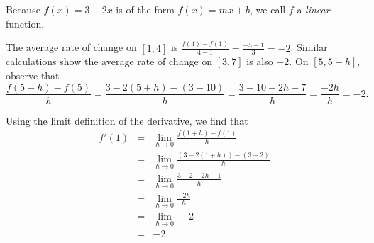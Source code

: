 \begin{activitySolution}
\ba
	\item Because $f(x) = 3 - 2x$ is of the form $f(x) = mx + b$, we call $f$ a \emph{linear} function.
	\item The average rate of change on $[1,4]$ is $\frac{f(4)-f(1)}{4-1} = \frac{-5 - 1}{3} = -2$.  Similar calculations show the average rate of change on $[3,7]$ is also $-2$.  On $[5,5+h]$, observe that 
	$$\frac{f(5+h)-f(5)}{h} = \frac{3-2(5+h) - (3-10)}{h} = \frac{3 - 10 - 2h + 7}{h} = \frac{-2h}{h} = -2.$$
	\item Using the limit definition of the derivative, we find that
	\begin{eqnarray*}
		f'(1) & = & \lim_{h \to 0} \frac{f(1+h) - f(1)}{h} \\
			& = & \lim_{h \to 0} \frac{(3 - 2(1+h)) - (3-2)}{h} \\
			& = & \lim_{h \to 0} \frac{3 - 2 - 2h - 1}{h} \\
			& = & \lim_{h \to 0} \frac{-2h}{h} \\
			& = & \lim_{h \to 0} -2 \\
			& = & -2.
	\end{eqnarray*}
\ea
\end{activitySolution}
\aftera